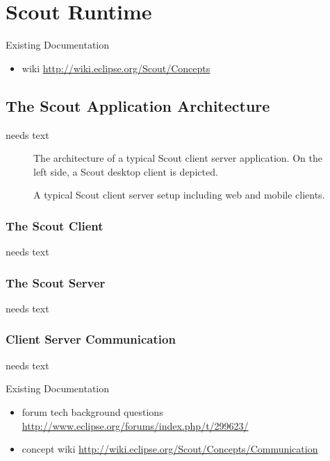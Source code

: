 \documentclass[a4paper,10pt,twoside]{book}
\begin{document}
  \sloppy
\fi


\chapter{Scout Runtime}

\noindent Existing Documentation
\begin{itemize}
  \item wiki \url{http://wiki.eclipse.org/Scout/Concepts}
\end{itemize}

\section{The Scout Application Architecture}
needs text



\begin{figure}
\caption{The architecture of a typical Scout client server application.
On the left side, a Scout desktop client is depicted.}
\end{figure}

\begin{figure}
\caption{A typical Scout client server setup including web and mobile clients.}
\end{figure}


\subsection{The Scout Client}
needs text

\subsection{The Scout Server}
needs text

\subsection{Client Server Communication}
needs text

\noindent Existing Documentation
\begin{itemize}
  \item forum tech background questions \url{http://www.eclipse.org/forums/index.php/t/299623/}
  \item concept wiki \url{http://wiki.eclipse.org/Scout/Concepts/Communication}
\end{itemize}
\end{document}
